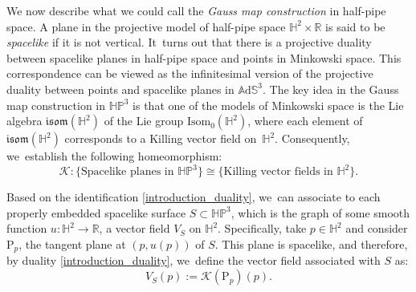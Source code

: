\documentclass[JEP,XML,SOM,Unicode,NoEqCountersInSection, NoFloatCountersInSection,published]{cedram}
\theoremstyle{plain}
\theoremstyle{definition}
\newcommand{\ads}{\mathbb{A}\mathrm{d}\mathbb{S}^3}
\newcommand{\HP}{\mathbb{HP}^3}
\begin{document}
We now describe what we could call the \emph{Gauss map construction} in half-pipe space. A plane in the projective model of half-pipe space \(\mathbb{H}^2 \times \mathbb{R}\) is said to be \emph{spacelike} if it is not vertical. It~turns out that there is a projective duality between spacelike planes in half-pipe space and points in Minkowski space. This correspondence can be viewed as the infinitesimal version of the projective duality between points and spacelike planes in \(\ads\). The key idea in the Gauss map construction in \(\HP\) is that one of the models of Minkowski space is the Lie algebra \(\mathfrak{isom}(\mathbb{H}^2)\) of the Lie group \(\text{Isom}_0(\mathbb{H}^2)\), where each element of \(\mathfrak{isom}(\mathbb{H}^2)\) corresponds to a Killing vector field on~\(\mathbb{H}^2\). Consequently, we~establish the following homeomorphism:
\begin{equation}\label{introduction_duality}
\mathcal{K}: \{\text{Spacelike planes in } \HP\} \cong \{\text{Killing vector fields in } \mathbb{H}^2\}.
\end{equation}

Based on the identification \eqref{introduction_duality}, we~can associate to each properly embedded spacelike surface \(S \subset \HP\), which is the graph of some smooth function \(u: \mathbb{H}^2 \to \mathbb{R}\), a vector field \(V_S\) on \(\mathbb{H}^2\). Specifically, take \(p \in \mathbb{H}^2\) and consider \(\mathrm{P}_p\), the tangent plane at \((p,u(p))\) of \(S\). This plane is spacelike, and therefore, by duality \eqref{introduction_duality}, we~define the vector field associated with \(S\) as:
\begin{equation}\label{2}
V_S(p):=\mathcal{K}(\mathrm{P}_p)(p).
\end{equation}
\end{document}
